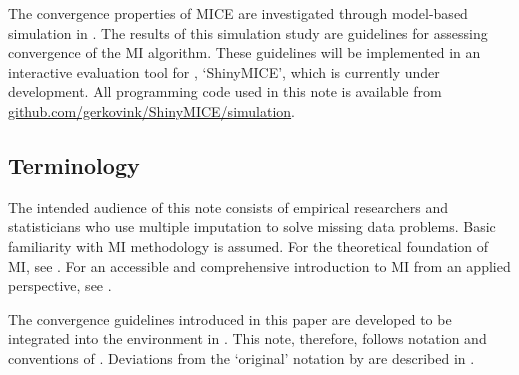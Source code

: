 \documentclass[article]{jss}
\begin{document}

The convergence properties of MICE are investigated through model-based simulation in  \citep{R}. The results of this simulation study are guidelines for assessing convergence of the MI algorithm. These guidelines will be implemented in an interactive evaluation tool for , `ShinyMICE', which is currently under development. All programming code used in this note is available from \href{https://github.com/gerkovink/shinyMice/simulation}{github.com/gerkovink/ShinyMICE/simulation}. 


\subsection{Terminology} \label{sec:terms}

The intended audience of this note consists of empirical researchers and statisticians who use multiple imputation to solve missing data problems. Basic familiarity with MI methodology is assumed. For the theoretical foundation of MI, see \cite{rubin87}. For an accessible and comprehensive introduction to MI from an applied perspective, see \cite{buur18}.  

The convergence guidelines introduced in this paper are developed to be integrated into the  environment \citep{mice} in  \citep{R}. This note, therefore, follows notation and conventions of \cite{mice}. Deviations from the `original' notation by \cite{rubin87} are described in \citep[\S~2.2.3]{buur18}. 
\end{document}
